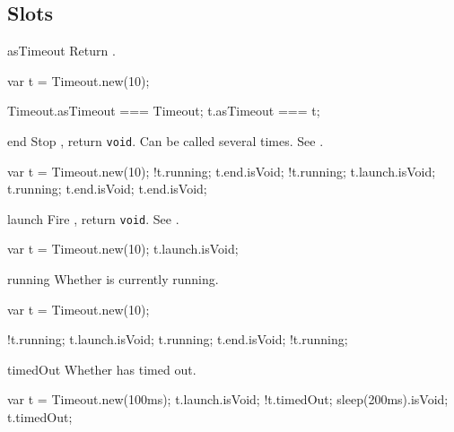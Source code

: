 \subsection{Slots}
\begin{urbiscriptapi}
\item[asTimeout] Return \this.
\begin{urbiassert}
var t = Timeout.new(10);

Timeout.asTimeout === Timeout;
      t.asTimeout === t;
\end{urbiassert}


\item[end] Stop \this, return \lstinline|void|.  Can be called several
  times.  See .

\begin{urbiassert}
var t = Timeout.new(10);
!t.running;
 t.end.isVoid;
!t.running;
t.launch.isVoid;
 t.running;
 t.end.isVoid;
 t.end.isVoid;
\end{urbiassert}


\item[launch]
  Fire \this, return \lstinline|void|.  See .

\begin{urbiassert}
var t = Timeout.new(10);
t.launch.isVoid;
\end{urbiassert}


\item[running]
  Whether is currently running.
\begin{urbiassert}
var t = Timeout.new(10);

!t.running;
 t.launch.isVoid;
 t.running;
 t.end.isVoid;
!t.running;
\end{urbiassert}


\item[timedOut]
  Whether \this has timed out.

\begin{urbiassert}
var t = Timeout.new(100ms);
 t.launch.isVoid;
!t.timedOut;
 sleep(200ms).isVoid;
 t.timedOut;
\end{urbiassert}


\end{urbiscriptapi}


